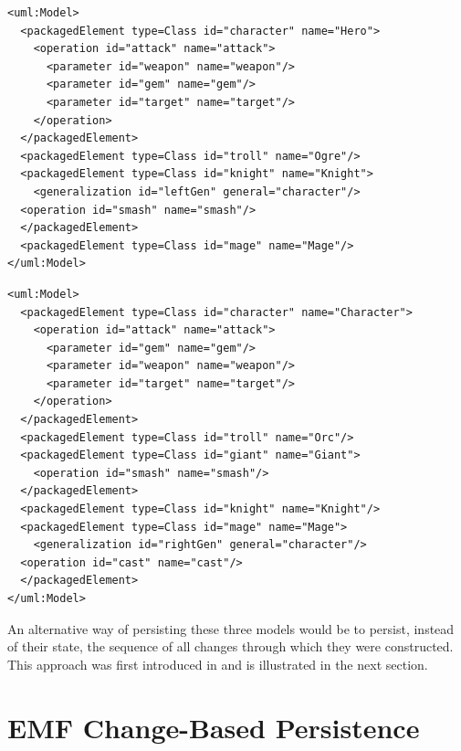 \vspace{-20pt}
\begin{lstlisting}[style=xmi,caption={Simplified XMI file of the left version in Figure \ref{fig:class_diagram_left}.},label=lst:xmimodel_left]
<uml:Model>
  <packagedElement type=Class id="character" name="Hero">
    <operation id="attack" name="attack">
      <parameter id="weapon" name="weapon"/>
      <parameter id="gem" name="gem"/>
      <parameter id="target" name="target"/>
    </operation>  
  </packagedElement>
  <packagedElement type=Class id="troll" name="Ogre"/>
  <packagedElement type=Class id="knight" name="Knight">
    <generalization id="leftGen" general="character"/>
  <operation id="smash" name="smash"/>
  </packagedElement>
  <packagedElement type=Class id="mage" name="Mage"/>
</uml:Model>
\end{lstlisting}

\vspace{-20pt}
\begin{lstlisting}[style=xmi,caption={Simplified XMI file of the right version of Figure \ref{fig:class_diagram_right}.},label=lst:xmimodel_right]
<uml:Model>
  <packagedElement type=Class id="character" name="Character">
    <operation id="attack" name="attack">
      <parameter id="gem" name="gem"/>
      <parameter id="weapon" name="weapon"/>
      <parameter id="target" name="target"/>
    </operation>
  </packagedElement>
  <packagedElement type=Class id="troll" name="Orc"/>
  <packagedElement type=Class id="giant" name="Giant">
    <operation id="smash" name="smash"/>
  </packagedElement>
  <packagedElement type=Class id="knight" name="Knight"/>
  <packagedElement type=Class id="mage" name="Mage">
    <generalization id="rightGen" general="character"/>
  <operation id="cast" name="cast"/>
  </packagedElement>
</uml:Model>
\end{lstlisting}

An alternative way of persisting these three models would be to persist, instead of their state, the sequence of all changes through which they were constructed. This approach was first introduced in \cite{DBLP:conf/models/YohannisKP17} and is illustrated in the next section.


\section{EMF Change-Based Persistence}
\label{sec:emf_change_based_persistence}

